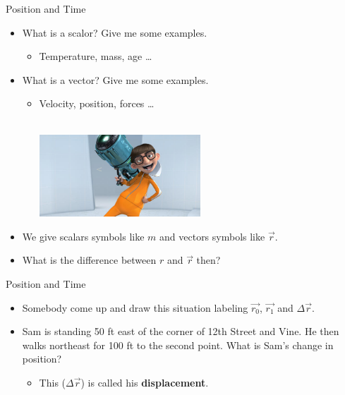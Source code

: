 \documentclass{beamer}
\begin{document}
\begin{frame}{Position and Time}
\begin{itemize}
   \item<1-> What is a scalor? Give me some examples.
      \begin{itemize}
         \item<2-> Temperature, mass, age \ldots
      \end{itemize}
   \item<3-> What is a vector? Give me some examples.
      \begin{itemize}
         \item<4-> Velocity, position, forces \ldots \\~\\
         \begin{center}
            \includegraphics[width=0.5\textwidth]{../figures/Vector-_Despicable_Me.jpg}
         \end{center}
      \end{itemize}
      \item<5-> We give scalars symbols like $m$ and vectors symbols like $\vec{r}$.
      \item<6-> What is the difference between $r$ and $\vec{r}$ then?
\end{itemize}
\end{frame}

\begin{frame}{Position and Time}
\begin{itemize}
   \item Somebody come up and draw this situation labeling $\vec{r_0}$, $\vec{r_1}$ and $\Delta \vec{r}$.
   \item Sam is standing 50 ft east of the corner of 12th Street and Vine. He then walks northeast for 100 ft to the second point. What is Sam's change in position?
   \begin{itemize}
      \item This ($\Delta \vec{r}$) is called his \textbf{displacement}.
   \end{itemize}
\end{itemize}
\begin{center}
\end{center}
\end{frame}
\end{document}

